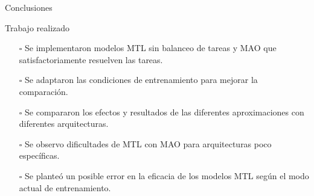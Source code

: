 \documentclass[xcolor=dvipsnames,table]{beamer}
\begin{document}
\begin{frame}{Conclusiones}
	\begin{block}{Trabajo realizado}
		\begin{itemize}
			\item[\rlap{\raisebox{0.3ex}{\hspace{0.4ex}\tiny \ding{52}}}$\square$] Se implementaron modelos MTL sin balanceo de tareas y MAO que satisfactoriamente resuelven las tareas.
			\item[\rlap{\raisebox{0.3ex}{\hspace{0.4ex}\tiny \ding{52}}}$\square$] Se adaptaron las condiciones de entrenamiento para mejorar la comparación.
			\item[\rlap{\raisebox{0.3ex}{\hspace{0.4ex}\tiny \ding{52}}}$\square$] Se compararon los efectos y resultados de las diferentes aproximaciones con diferentes arquitecturas.
			\item[\rlap{\raisebox{0.3ex}{\hspace{0.4ex}\tiny \ding{52}}}$\square$] Se observo dificultades de MTL con MAO para arquitecturas poco específicas.
			\item[\rlap{\raisebox{0.3ex}{\hspace{0.4ex}\tiny \ding{52}}}$\square$] Se planteó un posible error en la eficacia de los modelos MTL según el modo actual de entrenamiento.
			
		\end{itemize}
	\end{block}
\end{frame}
\end{document}
